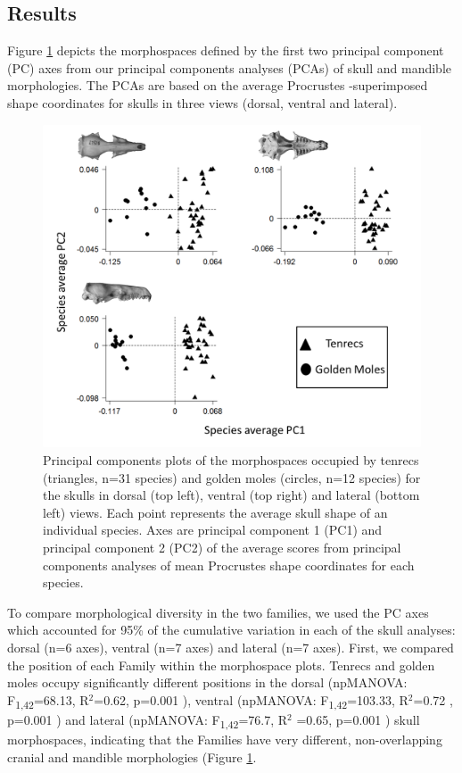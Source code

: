 \documentclass[12pt,a4paper]{article}
\begin{document}
\subsection{Results}
	Figure \ref{fig:threePCA} depicts the morphospaces defined by the first two principal component (PC) axes from our principal components analyses (PCAs) of skull and mandible morphologies. The PCAs are based on the average Procrustes -superimposed shape coordinates for skulls in three views (dorsal, ventral and lateral).
	\begin{figure}[!htbp]
	\centering
	\includegraphics[width=1\linewidth, height=1\textheight, keepaspectratio]{figures/PCA_threeplot.png}
	\caption[Morphospace (principal components) plot of morphological diversity in tenrec and golden mole skulls.]
		{Principal components plots of the morphospaces occupied by tenrecs (triangles, n=31 species) and golden moles (circles, n=12 species) for the skulls in dorsal (top left), ventral (top right) and lateral (bottom left) views. Each point represents the average skull shape of an individual species. Axes are principal component 1 (PC1) and principal component 2 (PC2) of the average scores from principal components analyses of mean Procrustes shape coordinates for each species.}
	\label{fig:threePCA}
	\end{figure}
	To compare morphological diversity in the two families, we used the PC axes which accounted for 95\% of the cumulative variation in each of the skull analyses: dorsal (n=6 axes), ventral (n=7 axes) and lateral (n=7 axes). First, we compared the position of each Family within the morphospace plots. Tenrecs and golden moles occupy significantly different positions in the dorsal (npMANOVA: F\textsubscript{1,42}=68.13, R$^2$=0.62, p=0.001 ), ventral (npMANOVA: F\textsubscript{1,42}=103.33, R$^2$=0.72 , p=0.001 ) and lateral (npMANOVA: F\textsubscript{1,42}=76.7, R$^2$ =0.65, p=0.001 ) skull morphospaces,  indicating that the Families have very different, non-overlapping cranial and mandible morphologies (Figure \ref{fig:threePCA}. 
	
\end{document}
